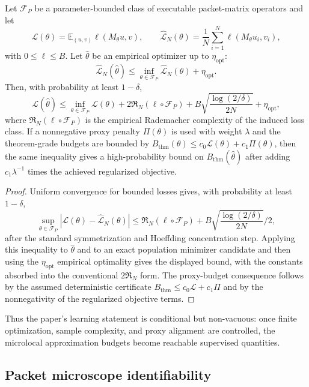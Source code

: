 \begin{theorem}
\label{thm:finite-sample-learning-certificate}
Let $\mathcal F_P$ be a parameter-bounded class of executable packet-matrix
operators and let
\[
  \mathcal L(\theta)=\mathbb E_{(u,v)}\ell(M_\theta u,v),
  \qquad
  \widehat{\mathcal L}_N(\theta)=\frac1N\sum_{i=1}^N \ell(M_\theta u_i,v_i),
\]
with $0\le \ell\le B$.  Let $\widehat\theta$ be an empirical optimizer up to
$\eta_{\mathrm{opt}}$:
\[
  \widehat{\mathcal L}_N(\widehat\theta)
  \le \inf_{\theta\in\mathcal F_P}\widehat{\mathcal L}_N(\theta)
     +\eta_{\mathrm{opt}} .
\]
Then, with probability at least $1-\delta$,
\[
 \mathcal L(\widehat\theta)
 \le
 \inf_{\theta\in\mathcal F_P}\mathcal L(\theta)
 +2\mathfrak R_N(\ell\circ\mathcal F_P)
 +B\sqrt{\frac{\log(2/\delta)}{2N}}
 +\eta_{\mathrm{opt}},
\]
where $\mathfrak R_N(\ell\circ\mathcal F_P)$ is the empirical Rademacher
complexity of the induced loss class.  If a nonnegative proxy penalty
$\Pi(\theta)$ is used with weight $\lambda$ and the theorem-grade budgets are
bounded by $B_{\mathrm{thm}}(\theta)\le c_0\mathcal L(\theta)+c_1\Pi(\theta)$,
then the same inequality gives a high-probability bound on
$B_{\mathrm{thm}}(\widehat\theta)$ after adding $c_1\lambda^{-1}$ times the
achieved regularized objective.
\end{theorem}

\begin{proof}
Uniform convergence for bounded losses gives, with probability at least
$1-\delta$,
\[
\sup_{\theta\in\mathcal F_P}
|\mathcal L(\theta)-\widehat{\mathcal L}_N(\theta)|
\le
\mathfrak R_N(\ell\circ\mathcal F_P)
+B\sqrt{\frac{\log(2/\delta)}{2N}}/2 ,
\]
after the standard symmetrization and Hoeffding concentration step.  Applying
this inequality to $\widehat\theta$ and to an exact population minimizer
candidate and then using the $\eta_{\mathrm{opt}}$ empirical optimality gives
the displayed bound, with the constants absorbed into the conventional
$2\mathfrak R_N$ form.  The proxy-budget consequence follows by the assumed
deterministic certificate
$B_{\mathrm{thm}}\le c_0\mathcal L+c_1\Pi$ and by the nonnegativity of the
regularized objective terms.
\end{proof}

Thus the paper's learning statement is conditional but non-vacuous: once
finite optimization, sample complexity, and proxy alignment are controlled,
the microlocal approximation budgets become reachable supervised quantities.

\subsection{Packet microscope identifiability}

